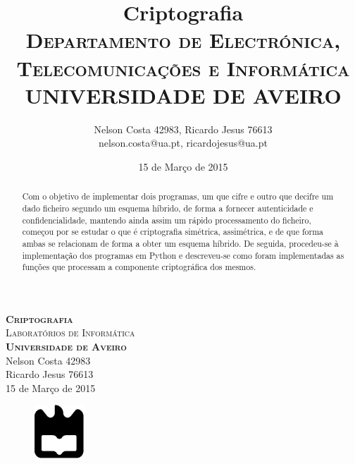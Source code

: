 \documentclass[a4paper,11pt,openright,oneside]{report}
\begin{document}
\begin{titlepage}
\begin{center}

{\vspace*{50mm}\textsc{\Huge\textbf{Criptografia}\\ \small{Laboratórios de Informática}}}\\[2cm]
{\textsc{\small\textbf{Universidade de Aveiro}}}\\[0.5cm]
{\small Nelson Costa 42983\\Ricardo Jesus 76613}\\[0.5cm]
{\small	15 de Março de 2015}\\

\begin{figure}[b]
\center
\graphicspath{}
\includegraphics[height=2cm]{ua.pdf}
\end{figure}

\end{center}

\end{titlepage}

\title{\textbf{Criptografia}\\[1cm]\textsc{\small {Departamento de Electrónica, Telecomunicações e Informática} \\ \large {UNIVERSIDADE DE AVEIRO}}}
\author{Nelson Costa 42983, Ricardo Jesus 76613\\nelson.costa@ua.pt, ricardojesus@ua.pt}
\date{15 de Março de 2015}

\maketitle


\begin{abstract}

Com o objetivo de implementar dois programas, um que cifre e outro que decifre um dado ficheiro segundo um esquema híbrido, de forma a fornecer autenticidade e confidencialidade, mantendo ainda assim um rápido processamento do ficheiro, começou por se estudar o que é criptografia simétrica, assimétrica, e de que forma ambas se relacionam de forma a obter um esquema híbrido. De seguida, procedeu-se à implementação dos programas em Python e descreveu-se como foram implementadas as funções que processam a componente criptográfica dos mesmos.

\end{abstract}
\end{document}
